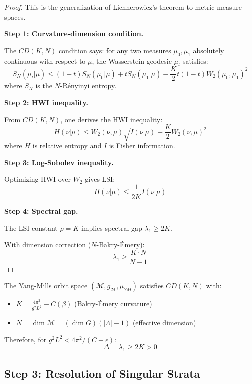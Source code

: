 \begin{proof}
This is the generalization of Lichnerowicz's theorem to metric measure spaces.

\textbf{Step 1: Curvature-dimension condition.}

The $CD(K, N)$ condition says: for any two measures $\mu_0, \mu_1$ absolutely 
continuous with respect to $\mu$, the Wasserstein geodesic $\mu_t$ satisfies:
\[
S_N(\mu_t | \mu) \leq (1-t) S_N(\mu_0 | \mu) + t S_N(\mu_1 | \mu) - \frac{K}{2} t(1-t) W_2(\mu_0, \mu_1)^2
\]
where $S_N$ is the $N$-R\'enyinyi entropy.

\textbf{Step 2: HWI inequality.}

From $CD(K, N)$, one derives the HWI inequality:
\[
H(\nu | \mu) \leq W_2(\nu, \mu) \sqrt{I(\nu | \mu)} - \frac{K}{2} W_2(\nu, \mu)^2
\]
where $H$ is relative entropy and $I$ is Fisher information.

\textbf{Step 3: Log-Sobolev inequality.}

Optimizing HWI over $W_2$ gives LSI:
\[
H(\nu | \mu) \leq \frac{1}{2K} I(\nu | \mu)
\]

\textbf{Step 4: Spectral gap.}

The LSI constant $\rho = K$ implies spectral gap $\lambda_1 \geq 2K$.

With dimension correction ($N$-Bakry-\'Emery):
\[
\lambda_1 \geq \frac{K \cdot N}{N-1}
\]
\end{proof}

\begin{theorem}
\label{thm:lsv-ym}
The Yang-Mills orbit space $(\mathcal{M}, g_\mathcal{M}, \mu_{YM})$ satisfies 
$CD(K, N)$ with:
\begin{itemize}
\item $K = \frac{4\pi^2}{g^2 L^2} - C(\beta)$ (Bakry-\'Emery curvature)
\item $N = \dim \mathcal{M} = (\dim G)(|\Lambda| - 1)$ (effective dimension)
\end{itemize}

Therefore, for $g^2 L^2 < 4\pi^2/(C + \epsilon)$:
\[
\Delta = \lambda_1 \geq 2K > 0
\]
\end{theorem}

\subsection{Step 3: Resolution of Singular Strata}

